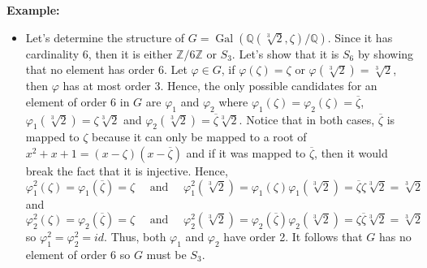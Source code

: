 \documentclass{article}
\newcommand{\Q}{\mathbb{Q}}
\newcommand{\Zn}[1]{\mathbb{Z}/ #1 \mathbb{Z}}
\DeclareMathOperator{\Aut}{\text{Aut}}
\DeclareMathOperator{\Gal}{\text{Gal}}
\newenvironment{example}{\noindent\textbf{Example:} \vspace{-0.2cm}\begin{itemize}}{\end{itemize}}
\begin{document}
\begin{example}
\begin{center}
    \end{center}
    Let's count the number of elements in $\Aut(\Q(\sqrt[3]{2}, \zeta) / \Q)$. Let $\phi \in \Aut(\Q(\sqrt[3]{2}, \zeta) / \Q)$, then $\varphi(\zeta)$ must be a root of $x^2 + x + 1$ so $\varphi(\zeta)$ can be mapped to $\zeta$ and $\overline{\zeta}$. Similarly, $\sqrt[3]{2}$ must be mapped to a root of $x^3 - 2$. But since $\zeta^3 = 1$, then $\varphi(\sqrt[3]{2})$ can be $\sqrt[3]{2}$, $\zeta\sqrt[3]{2}$ or $\overline{\zeta} \sqrt[3]{2}$. Since $\varphi$ is only determined by $\varphi(\zeta)$ and $\varphi(\sqrt[3]{2})$, then there are 6 elements in $\Aut(\Q(\sqrt[3]{2}, \zeta) / \Q)$. Therefore, it is a Galois extension. 
    \item Let's determine the structure of $G = \Gal(\Q(\sqrt[3]{2}, \zeta) / \Q)$. Since it has cardinality 6, then it is either $\Zn{6}$ or $S_3$. Let's show that it is $S_6$ by showing that no element has order 6. Let $\varphi \in G$, if $\varphi(\zeta) = \zeta$ or $\varphi(\sqrt[3]{2}) = \sqrt[3]{2}$, then $\varphi$ has at most order 3. Hence, the only possible candidates for an element of order 6 in $G$ are $\varphi_1$ and $\varphi_2$ where $\varphi_1(\zeta) = \varphi_2(\zeta) = \overline{\zeta}$, $\varphi_1(\sqrt[3]{2}) = \zeta \sqrt[3]{2}$ and $\varphi_2(\sqrt[3]{2}) = \overline{\zeta} \sqrt[3]{2}$. Notice that in both cases, $\overline{\zeta}$ is mapped to $\zeta$ because it can only be mapped to a root of $x^2 + x + 1 = (x - \zeta)(x - \overline{\zeta})$ and if it was mapped to $\overline{\zeta}$, then it would break the fact that it is injective. Hence,
    $$\varphi_1^2(\zeta) = \varphi_1(\overline{\zeta}) = \zeta \quad \text{ and }\quad \varphi_1^2(\sqrt[3]{2}) = \varphi_1(\zeta)\varphi_1(\sqrt[3]{2}) = \overline{\zeta}\zeta \sqrt[3]{2} = \sqrt[3]{2}$$
    and 
    $$\varphi_2^2(\zeta) = \varphi_2(\overline{\zeta}) = \zeta \quad \text{ and }\quad \varphi_2^2(\sqrt[3]{2}) = \varphi_2(\overline{\zeta})\varphi_2(\sqrt[3]{2}) = \zeta \overline{\zeta} \sqrt[3]{2} = \sqrt[3]{2}$$
    so $\varphi_1^2 = \varphi_2^2 = id$. Thus, both $\varphi_1$ and $\varphi_2$ have order 2. It follows that $G$ has no element of order 6 so $G$ must be $S_3$. 
\end{example}
\end{document}
